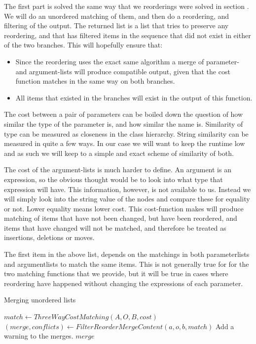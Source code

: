 \documentclass[11pt]{article}
\begin{document}
The first part is solved the same way that we reorderings were solved in section . We will do an unordered matching of them, and then do a reordering, and filtering of the output. The returned list is a list that tries to preserve any reordering, and that has filtered items in the sequence that did not exist in either of the two branches. This will hopefully ensure that:

\begin{itemize}
   \item Since the reordering uses the exact same algorithm a merge of parameter- and argument-lists will produce compatible output, given that the cost function matches in the same way on both branches.
   \item All items that existed in the branches will exist in the output of this function. 
\end{itemize}
The cost between a pair of parameters can be boiled down the question of how similar the type of the parameter is, and how similar the name is. Similarity of type can be measured as closeness in the class hierarchy. String similarity can be measured in quite a few ways. In our case we will want to keep the runtime low and as such we will keep to a simple and exact scheme of similarity of both.

The cost of the argument-lists is much harder to define. An argument is an expression, so the obvious thought would be to look into what type that expression will have. This information, however, is not available to us. Instead we will simply look into the string value of the nodes and compare these for equality or not. Lower equality means lower cost. This cost-function makes will produce matching of items that have not been changed, but have been reordered, and items that have changed will not be matched, and therefore be treated as insertions, deletions or moves.

The first item in the above list, depends on the matchings in both parameterlists and argumentlists to match the same items. This is not generally true for for the two matching functions that we provide, but it will be true in cases where reordering have happened without changing the expressions of each parameter.

\begin{algorithm}
  \caption{Merging unordered lists}
  \label{Listmerger}
\begin{algorithmic}
    \State $match \gets ThreeWayCostMatching(A, O, B, cost)$
    \State $(merge, conflicts) \gets FilterReorderMergeContent(a, o, b, match)$
        \State Add a warning to the merges.
    \EndFor
    \State \Return $merge$
\EndFunction
\end{algorithmic}
\end{algorithm}
\end{document}

